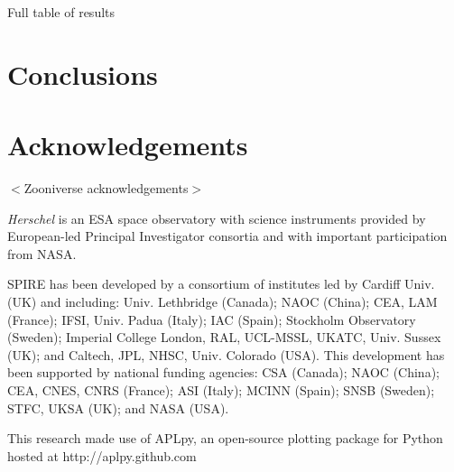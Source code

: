 \documentclass[a4,useAMS,usenatbib]{mn2e}
\newcommand*{\chck}[1]{{\color{red}$<$#1$>$}}
\begin{document}
Full table of results

\section{Conclusions}


\section{Acknowledgements}
\chck{Zooniverse acknowledgements}

{\em Herschel} is an ESA space observatory with science instruments
provided by European-led Principal Investigator consortia and with important
participation from NASA.

SPIRE has been developed by a consortium of institutes led by Cardiff
Univ. (UK) and including: Univ. Lethbridge (Canada); NAOC (China);
CEA, LAM (France); IFSI, Univ. Padua (Italy); IAC (Spain); Stockholm
Observatory (Sweden); Imperial College London, RAL, UCL-MSSL, UKATC,
Univ. Sussex (UK); and Caltech, JPL, NHSC, Univ. Colorado (USA). This
development has been supported by national funding agencies: CSA
(Canada); NAOC (China); CEA, CNES, CNRS (France); ASI (Italy); MCINN
(Spain); SNSB (Sweden); STFC, UKSA (UK); and NASA (USA).

This research made use of APLpy, an open-source plotting package for
Python hosted at http://aplpy.github.com
\end{document}
